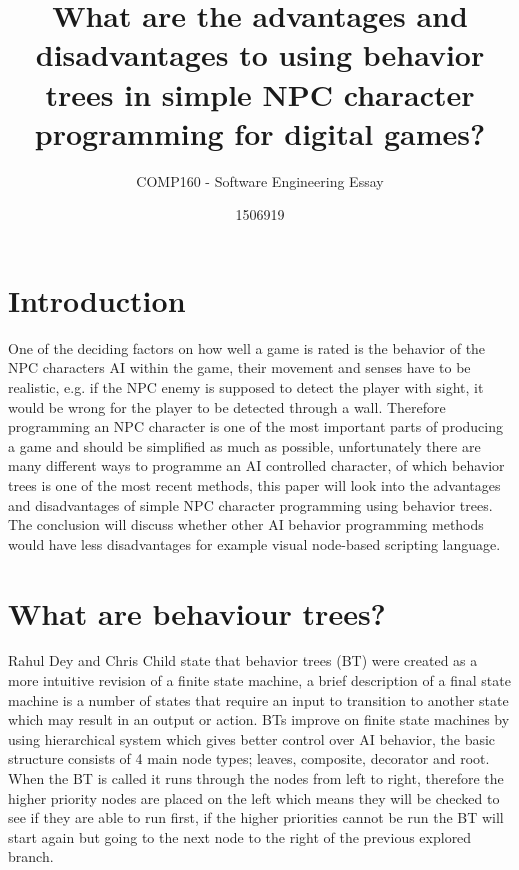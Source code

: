 \documentclass{scrartcl}
\title{What are the advantages and disadvantages to using behavior trees in simple NPC character programming for digital games?}
\subtitle{COMP160 - Software Engineering Essay}
\author{1506919}
\begin{document}
\maketitle


\section{Introduction}

One of the deciding factors on how well a game is rated is the behavior of the NPC characters AI within the game, their movement and senses have to be realistic\cite{dey2013ql}, e.g. if the NPC enemy is supposed to detect the player with sight, it would be wrong for the player to be detected through a wall. Therefore programming an NPC character is one of the most important parts of producing a game\cite{buckland2005programming} and should be simplified as much as possible, unfortunately there are many different ways to programme an AI controlled character, of which behavior trees is one of the most recent methods\cite{GDCVault}, this paper will look into the advantages and disadvantages of simple NPC character programming using behavior trees. The conclusion will discuss whether other AI behavior programming methods would have less disadvantages for example visual node-based scripting language.

\section{What are behaviour trees?}

Rahul Dey and Chris Child state that behavior trees (BT) were created as a more intuitive revision of a finite state machine\cite{dey2013ql}, a brief description of a final state machine is a number of states that require an input to transition to another state which may result in an output or action\cite{buckland2005programming}. BTs improve on finite state machines by using hierarchical system which gives better control over AI behavior, the basic structure consists of 4 main node types\cite{gamasutra}; leaves, composite, decorator and root. When the BT is called it runs through the nodes from left to right, therefore the higher priority nodes are placed on the left which means they will be checked to see if they are able to run first, if the higher priorities cannot be run the BT will start again but going to the next node to the right of the previous explored branch.
\end{document}
